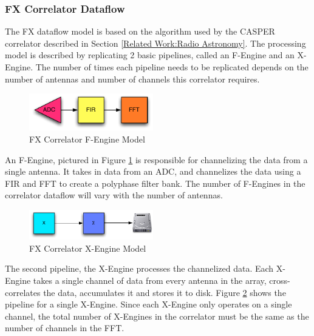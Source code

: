 \subsubsection{FX Correlator Dataflow}

The FX dataflow model is based on the algorithm used by the CASPER correlator described in Section \ref{Related Work:Radio Astronomy}. The processing model is described by replicating 2 basic pipelines, called an F-Engine and an X-Engine. The number of times each pipeline needs to be replicated depends on the number of antennas and number of channels this correlator requires.

\begin{figure}[h!]
  \centering
    \includegraphics[width=0.48\textwidth]{Images/C4/fx_f_engine.pdf}
  \caption{FX Correlator F-Engine Model}
  \label{fig: C4/fx_f_engine.pdf}
\end{figure}

An F-Engine, pictured in Figure \ref{fig: C4/fx_f_engine.pdf} is responsible for channelizing the data from a single antenna. 
It takes in data from an ADC, and channelizes the data using a FIR and FFT to create a polyphase filter bank. 
The number of F-Engines in the correlator dataflow will vary with the number of antennas.

\begin{figure}[h!]
  \centering
    \includegraphics[width=0.48\textwidth]{Images/C4/fx_x_engine.pdf}
  \caption{FX Correlator X-Engine Model}
  \label{fig: C4/fx_x_engine.pdf}
\end{figure}

The second pipeline, the X-Engine processes the channelized data. 
Each X-Engine takes a single channel of data from every antenna in the array, cross-correlates the data, accumulates it and stores it to disk. 
Figure \ref{fig: C4/fx_x_engine.pdf} shows the pipeline for a single X-Engine. 
Since each X-Engine only operates on a single channel, the total number of X-Engines in the correlator must be the same as the number of channels in the FFT.

